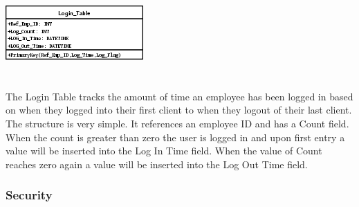 \documentclass{report}
\begin{document}
	\includegraphics{Tables/LoginTable.png}\\
	\\
	\\
	The Login Table tracks the amount of time an employee has been logged in based on when
	they logged into their first client to when they logout of their last client. The structure
	is very simple. It references an employee ID and has a Count field. When the count is greater
	than zero the user is logged in and upon first entry a value will be inserted into the
	Log In Time field. When the value of Count reaches zero again a value will be inserted into
	the Log Out Time field.

	\subsubsection{Security}
\end{document}
